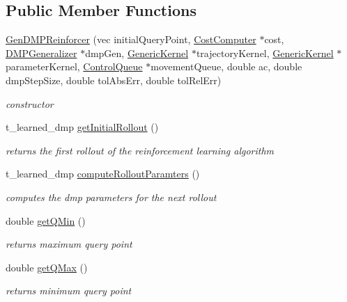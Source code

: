 \subsection*{\-Public \-Member \-Functions}
\begin{DoxyCompactItemize}
\item 
\hyperlink{classGenDMPReinforcer_ad57993f556bff5c44af1f74b2804761b}{\-Gen\-D\-M\-P\-Reinforcer} (vec initial\-Query\-Point, \hyperlink{classCostComputer}{\-Cost\-Computer} $\ast$cost, \hyperlink{classDMPGeneralizer}{\-D\-M\-P\-Generalizer} $\ast$dmp\-Gen, \hyperlink{classGenericKernel}{\-Generic\-Kernel} $\ast$trajectory\-Kernel, \hyperlink{classGenericKernel}{\-Generic\-Kernel} $\ast$parameter\-Kernel, \hyperlink{classControlQueue}{\-Control\-Queue} $\ast$movement\-Queue, double ac, double dmp\-Step\-Size, double tol\-Abs\-Err, double tol\-Rel\-Err)
\begin{DoxyCompactList}\small\item\em constructor \end{DoxyCompactList}\item 
t\-\_\-learned\-\_\-dmp \hyperlink{classGenDMPReinforcer_adf7e9353b54e429649fb5dd5dd17c28e}{get\-Initial\-Rollout} ()
\begin{DoxyCompactList}\small\item\em returns the first rollout of the reinforcement learning algorithm \end{DoxyCompactList}\item 
t\-\_\-learned\-\_\-dmp \hyperlink{classGenDMPReinforcer_aace5aaa5519a64a33f05b0fd95ac0b6e}{compute\-Rollout\-Paramters} ()
\begin{DoxyCompactList}\small\item\em computes the dmp parameters for the next rollout \end{DoxyCompactList}\item 
double \hyperlink{classGenDMPReinforcer_aaeb0d7711cfc43d52b35a8ba8e0698b9}{get\-Q\-Min} ()
\begin{DoxyCompactList}\small\item\em returns maximum query point \end{DoxyCompactList}\item 
double \hyperlink{classGenDMPReinforcer_a70498092175c9c6f81ce379323263ace}{get\-Q\-Max} ()
\begin{DoxyCompactList}\small\item\em returns minimum query point \end{DoxyCompactList}\end{DoxyCompactItemize}


